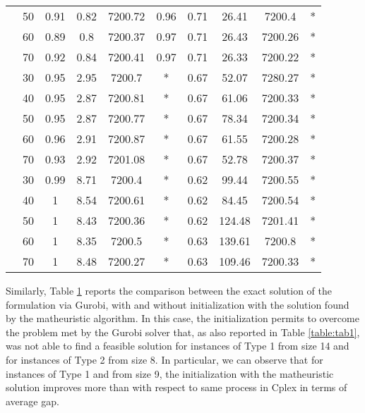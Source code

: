 \begin{table}[!h]
\begin{tabular}{|c|c|c c c c|c c c c|}
& 50 &	0.91 &	0.82 &	7200.72 &	0.96 &	0.71 &	26.41 &	7200.4	 &*\\
& 60 &	0.89 &	0.8 &	7200.37 &	0.97 &	0.71 &	26.43 &	7200.26 &	*\\
& 70 &	0.92 &	0.84 &	7200.41 &	0.97 &	0.71 &	26.33 &	7200.22 &	*\\
\hline\multirow{5}{*}{\midrule 14} & 30 &	0.95 &	2.95 &	7200.7 &	* &	0.67 &	52.07 &	7280.27 &	*\\
& 40 &	0.95 &	2.87 &	7200.81 &	* &	0.67 &	61.06 &	7200.33 &	*\\
& 50 &	0.95 &	2.87 &	7200.77 &	* &	0.67 &	78.34 &	7200.34 &	*\\
& 60 &	0.96 &	2.91 &	7200.87 &	* &	0.67 &	61.55 &	7200.28 &	*\\
& 70 &	0.93 &	2.92 &	7201.08 &	* &	0.67 &	52.78 &	7200.37 &	*\\
\hline
\multirow{5}{*}{\midrule 15} & 30 &	0.99 &	8.71 &	7200.4 &	* &	0.62 &	99.44 &	7200.55	& *\\
& 40 &	1 &	8.54 &	7200.61	& *	 & 0.62	& 84.45	& 7200.54 &	*\\
& 50 &	1 &	8.43 &	7200.36	& *	& 0.62 &	124.48 &	7201.41 &	*\\
& 60 &	1 &	8.35 &	7200.5 &	* &	0.63 &	139.61	& 7200.8 &	*\\
& 70 &	1 &	8.48 &	7200.27 &	* &	0.63 &	109.46 &	7200.33 &	*\\
\hline
\end{tabular}
\label{table:tab3}
\end{table}


Similarly, Table \ref{table:tab3} reports the comparison between the exact solution of the formulation via Gurobi, with and without initialization with the solution found by the matheuristic algorithm. In this case, the initialization permits to overcome the problem met by the Gurobi solver that, as also reported in Table \ref{table:tab1}, was not able to find a feasible solution for instances of Type 1 from size 14 and for instances of Type 2 from size 8. In particular, we can observe that for instances of Type 1 and from size 9, the initialization with the matheuristic solution improves more than with respect to same process in Cplex in terms of average gap.


